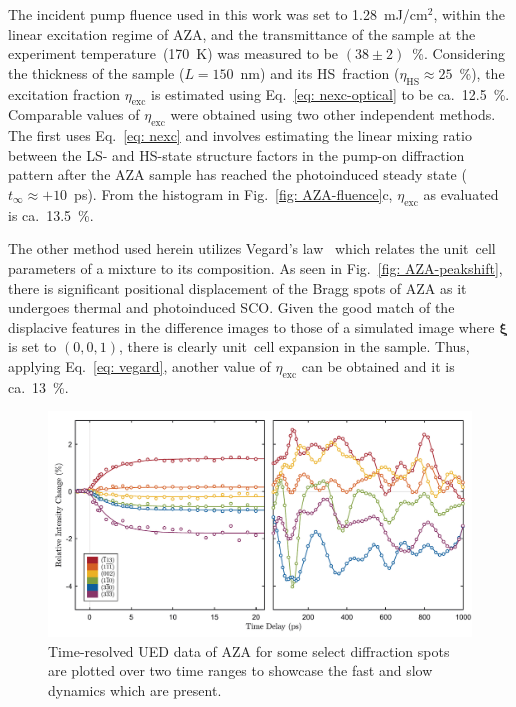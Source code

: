 The incident pump fluence used in this work was set to 1.28~mJ/cm$^2$,
within the linear excitation regime of AZA,
and the transmittance of the sample at the experiment temperature~(170~K)
was measured to be $(38 \pm 2)$~\%.
Considering the thickness of the sample ($L = 150$~nm)
and its HS~fraction ($\eta_\text{HS} \approx 25$~\%),
the excitation fraction $\eta_\text{exc}$ is estimated using Eq.~\eqref{eq: nexc-optical}
to be ca.~12.5~\%.
%
Comparable values of $\eta_\text{exc}$ were obtained using two other independent methods.
The first uses Eq.~\eqref{eq: nexc} and involves estimating the linear mixing ratio
between the LS- and HS-state structure factors in the pump-on diffraction pattern
after the AZA sample has reached the photoinduced steady state ($t_\infty \approx +10$~ps).
From the histogram in Fig.~\ref{fig: AZA-fluence}c,
$\eta_\text{exc}$ as evaluated is ca.~13.5~\%.


The other method used herein utilizes Vegard's law~\cite{Vegard1921}
which relates the unit~cell parameters of a mixture to its composition.
%
As seen in Fig.~\ref{fig: AZA-peakshift}, there is significant positional displacement
of the Bragg spots of AZA as it undergoes thermal and photoinduced SCO.
%
Given the good match of the displacive features in the difference images
to those of a simulated image where $\boldsymbol{\xi}$ is set to $(0, 0, 1)$,
there is clearly unit~cell expansion in the sample.
%
Thus, applying Eq.~\eqref{eq: vegard}, another value of $\eta_\text{exc}$
can be obtained and it is ca.~13~\%.

\begin{figure}[t!]
  \centering
  \includegraphics[width = \textwidth]{Figures/fig_AZA_UEDtraces.pdf}
  \caption[Time-resolved UED data of AZA.]{
  Time-resolved UED data of AZA for some select diffraction spots
  are plotted over two time ranges to showcase the fast and slow dynamics
  which are present.
  }
  \label{fig: AZA-UEDtraces}
\end{figure}


